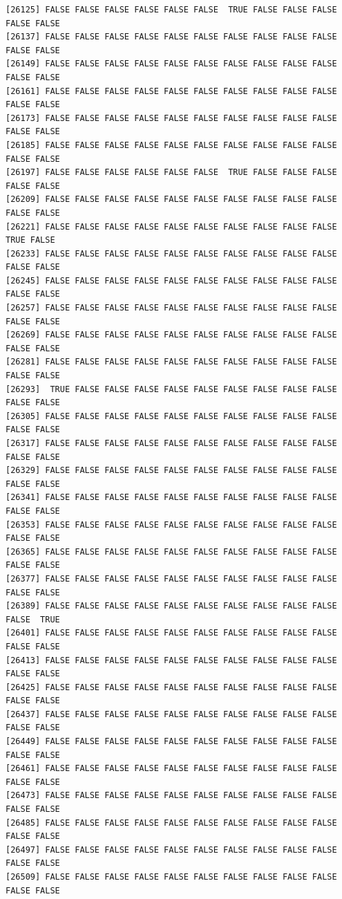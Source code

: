 \documentclass[
  a4paper,
  DIV=11,
  numbers=noendperiod]{scrartcl}
\begin{document}
\begin{verbatim}
[26125] FALSE FALSE FALSE FALSE FALSE FALSE  TRUE FALSE FALSE FALSE FALSE FALSE
[26137] FALSE FALSE FALSE FALSE FALSE FALSE FALSE FALSE FALSE FALSE FALSE FALSE
[26149] FALSE FALSE FALSE FALSE FALSE FALSE FALSE FALSE FALSE FALSE FALSE FALSE
[26161] FALSE FALSE FALSE FALSE FALSE FALSE FALSE FALSE FALSE FALSE FALSE FALSE
[26173] FALSE FALSE FALSE FALSE FALSE FALSE FALSE FALSE FALSE FALSE FALSE FALSE
[26185] FALSE FALSE FALSE FALSE FALSE FALSE FALSE FALSE FALSE FALSE FALSE FALSE
[26197] FALSE FALSE FALSE FALSE FALSE FALSE  TRUE FALSE FALSE FALSE FALSE FALSE
[26209] FALSE FALSE FALSE FALSE FALSE FALSE FALSE FALSE FALSE FALSE FALSE FALSE
[26221] FALSE FALSE FALSE FALSE FALSE FALSE FALSE FALSE FALSE FALSE  TRUE FALSE
[26233] FALSE FALSE FALSE FALSE FALSE FALSE FALSE FALSE FALSE FALSE FALSE FALSE
[26245] FALSE FALSE FALSE FALSE FALSE FALSE FALSE FALSE FALSE FALSE FALSE FALSE
[26257] FALSE FALSE FALSE FALSE FALSE FALSE FALSE FALSE FALSE FALSE FALSE FALSE
[26269] FALSE FALSE FALSE FALSE FALSE FALSE FALSE FALSE FALSE FALSE FALSE FALSE
[26281] FALSE FALSE FALSE FALSE FALSE FALSE FALSE FALSE FALSE FALSE FALSE FALSE
[26293]  TRUE FALSE FALSE FALSE FALSE FALSE FALSE FALSE FALSE FALSE FALSE FALSE
[26305] FALSE FALSE FALSE FALSE FALSE FALSE FALSE FALSE FALSE FALSE FALSE FALSE
[26317] FALSE FALSE FALSE FALSE FALSE FALSE FALSE FALSE FALSE FALSE FALSE FALSE
[26329] FALSE FALSE FALSE FALSE FALSE FALSE FALSE FALSE FALSE FALSE FALSE FALSE
[26341] FALSE FALSE FALSE FALSE FALSE FALSE FALSE FALSE FALSE FALSE FALSE FALSE
[26353] FALSE FALSE FALSE FALSE FALSE FALSE FALSE FALSE FALSE FALSE FALSE FALSE
[26365] FALSE FALSE FALSE FALSE FALSE FALSE FALSE FALSE FALSE FALSE FALSE FALSE
[26377] FALSE FALSE FALSE FALSE FALSE FALSE FALSE FALSE FALSE FALSE FALSE FALSE
[26389] FALSE FALSE FALSE FALSE FALSE FALSE FALSE FALSE FALSE FALSE FALSE  TRUE
[26401] FALSE FALSE FALSE FALSE FALSE FALSE FALSE FALSE FALSE FALSE FALSE FALSE
[26413] FALSE FALSE FALSE FALSE FALSE FALSE FALSE FALSE FALSE FALSE FALSE FALSE
[26425] FALSE FALSE FALSE FALSE FALSE FALSE FALSE FALSE FALSE FALSE FALSE FALSE
[26437] FALSE FALSE FALSE FALSE FALSE FALSE FALSE FALSE FALSE FALSE FALSE FALSE
[26449] FALSE FALSE FALSE FALSE FALSE FALSE FALSE FALSE FALSE FALSE FALSE FALSE
[26461] FALSE FALSE FALSE FALSE FALSE FALSE FALSE FALSE FALSE FALSE FALSE FALSE
[26473] FALSE FALSE FALSE FALSE FALSE FALSE FALSE FALSE FALSE FALSE FALSE FALSE
[26485] FALSE FALSE FALSE FALSE FALSE FALSE FALSE FALSE FALSE FALSE FALSE FALSE
[26497] FALSE FALSE FALSE FALSE FALSE FALSE FALSE FALSE FALSE FALSE FALSE FALSE
[26509] FALSE FALSE FALSE FALSE FALSE FALSE FALSE FALSE FALSE FALSE FALSE FALSE

\end{verbatim}
\end{document}
